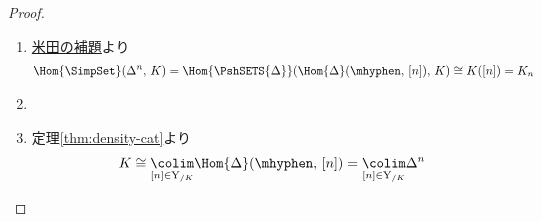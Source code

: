 \documentclass[TQFT_main]{subfiles}
\begin{document}
\begin{proof}
    \begin{enumerate}
        \item \hyperref[lem:Yoneda]{米田の補題}より
        \begin{align}
            \Hom{\SimpSet} (\Delta^n,\, K) 
            =\Hom{\PshSETS{\Delta}} (\Hom{\Delta}(\mhyphen,\, [n]),\, K)
            \cong K([n]) = K_n
        \end{align}
        \item 
        \item 定理\ref{thm:density-cat}より
        \begin{align}
            K \cong \underset{[n] \in \mathrm{Y}_{/K}}{\colim}\Hom{\Delta}(\mhyphen,\, [n]) = \underset{[n] \in \mathrm{Y}_{/K}}{\colim} \Delta^n
        \end{align}
        
    \end{enumerate}
    
\end{proof}
\end{document}
